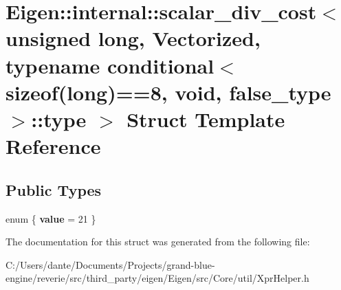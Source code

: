 \hypertarget{struct_eigen_1_1internal_1_1scalar__div__cost_3_01unsigned_01long_00_01_vectorized_00_01typenamea197e29684b99203d4e90be10117c3ad}{}\section{Eigen\+::internal\+::scalar\+\_\+div\+\_\+cost$<$ unsigned long, Vectorized, typename conditional$<$ sizeof(long)==8, void, false\+\_\+type $>$\+::type $>$ Struct Template Reference}
\label{struct_eigen_1_1internal_1_1scalar__div__cost_3_01unsigned_01long_00_01_vectorized_00_01typenamea197e29684b99203d4e90be10117c3ad}
\subsection*{Public Types}
\begin{DoxyCompactItemize}
\item 
\mbox{\label{struct_eigen_1_1internal_1_1scalar__div__cost_3_01unsigned_01long_00_01_vectorized_00_01typenamea197e29684b99203d4e90be10117c3ad_a2a0518ad711ea94990626eaeba7cb7ff}} 
enum \{ {\bfseries value} = 21
 \}
\end{DoxyCompactItemize}


The documentation for this struct was generated from the following file\+:\begin{DoxyCompactItemize}
\item 
C\+:/\+Users/dante/\+Documents/\+Projects/grand-\/blue-\/engine/reverie/src/third\+\_\+party/eigen/\+Eigen/src/\+Core/util/Xpr\+Helper.\+h\end{DoxyCompactItemize}
